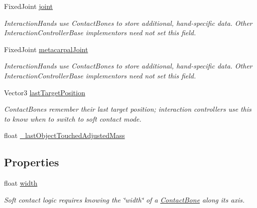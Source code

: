 \begin{DoxyCompactItemize}
Fixed\+Joint \mbox{\hyperlink{class_leap_1_1_unity_1_1_interaction_1_1_contact_bone_a0e26687a959891f032733c206c91dd57}{joint}}
\begin{DoxyCompactList}\small\item\em Interaction\+Hands use Contact\+Bones to store additional, hand-\/specific data. Other Interaction\+Controller\+Base implementors need not set this field. \end{DoxyCompactList}\item 
Fixed\+Joint \mbox{\hyperlink{class_leap_1_1_unity_1_1_interaction_1_1_contact_bone_a609880a3d01dd5e23b6b03b546cc2ba4}{metacarpal\+Joint}}
\begin{DoxyCompactList}\small\item\em Interaction\+Hands use Contact\+Bones to store additional, hand-\/specific data. Other Interaction\+Controller\+Base implementors need not set this field. \end{DoxyCompactList}\item 
Vector3 \mbox{\hyperlink{class_leap_1_1_unity_1_1_interaction_1_1_contact_bone_a89bc51c6c1204371ec97fdb6d2d3d8e8}{last\+Target\+Position}}
\begin{DoxyCompactList}\small\item\em Contact\+Bones remember their last target position; interaction controllers use this to know when to switch to soft contact mode. \end{DoxyCompactList}\item 
float \mbox{\hyperlink{class_leap_1_1_unity_1_1_interaction_1_1_contact_bone_a703d40dc7b6b968a768515b9f0c07b69}{\+\_\+last\+Object\+Touched\+Adjusted\+Mass}}
\end{DoxyCompactItemize}
\subsection*{Properties}
\begin{DoxyCompactItemize}
\item 
float \mbox{\hyperlink{class_leap_1_1_unity_1_1_interaction_1_1_contact_bone_a4c9d9346098152d645a62eb3b0bb0b4c}{width}}
\begin{DoxyCompactList}\small\item\em Soft contact logic requires knowing the \char`\"{}width\char`\"{} of a \mbox{\hyperlink{class_leap_1_1_unity_1_1_interaction_1_1_contact_bone}{Contact\+Bone}} along its axis. \end{DoxyCompactList}\end{DoxyCompactItemize}


